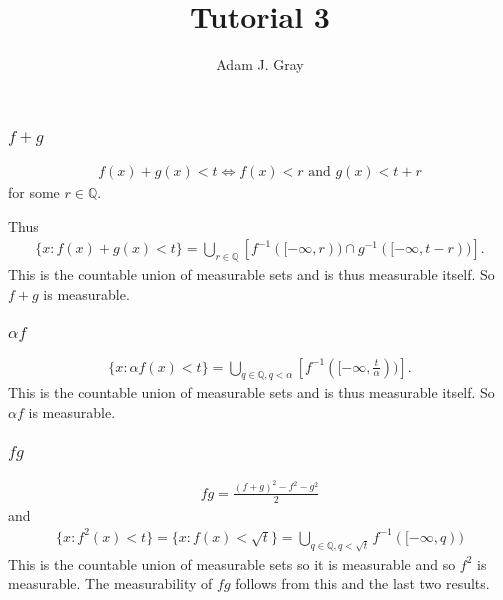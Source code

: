 \documentclass{unswmaths}
\begin{document}
\author{Adam J. Gray}
\title{Tutorial 3}
\subject{Measure Theory}

\newcommand{\llra}{\Leftrightarrow}

\unswtitle

\section{}
\subsection{}
\subsubsection{$ f + g $}

\begin{align*}
    f(x) + g(x) < t \llra f(x) < r \text{ and } g(x) < t + r
\end{align*}
for some $ r \in \mathbb{Q} $.

Thus
\begin{align*}
    \{ x : f(x) + g(x) < t \} = \bigcup_{r \in \mathbb{Q}} \left[ f^{-1}([-\infty, r)) \cap g^{-1}([-\infty, t-r)) \right].
\end{align*}
This is the countable union of measurable sets and is thus measurable itself. So $ f + g $ is measurable.

\subsubsection{$ \alpha f $}

\begin{align*}
    \{ x : \alpha f(x) < t \} = \bigcup_{q \in \mathbb{Q}, q < \alpha} \left[ f^{-1}([-\infty, \frac{t}{\alpha})) \right].
\end{align*}
This is the countable union of measurable sets and is thus measurable itself. So $ \alpha f $ is measurable.

\subsubsection{$ fg $}

\begin{align*}
    fg = \frac{(f + g)^{2} - f^2 - g^2}{2}
\end{align*}
and
\begin{align*}
    \{ x : f^{2}(x) < t \} = \{ x : f(x) < \sqrt{t} \} = \bigcup_{q \in \mathbb{Q}, q < \sqrt{t}} f^{-1}([-\infty, q))
\end{align*}
This is the countable union of measurable sets so it is measurable and so $ f^2 $ is measurable. The measurability of $ fg $ follows from this and the last two results.
\end{document}
